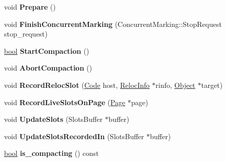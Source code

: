 \begin{DoxyCompactItemize}
void {\bfseries Prepare} ()
\item 
\mbox{\label{classv8_1_1internal_1_1MarkCompactCollector_ab298a4186180480a32cdc871b0471aec}} 
void {\bfseries Finish\+Concurrent\+Marking} (Concurrent\+Marking\+::\+Stop\+Request stop\+\_\+request)
\item 
\mbox{\label{classv8_1_1internal_1_1MarkCompactCollector_a43093f29487f7a532733fe34457e1d85}} 
\mbox{\hyperlink{classbool}{bool}} {\bfseries Start\+Compaction} ()
\item 
\mbox{\label{classv8_1_1internal_1_1MarkCompactCollector_a4fdf8ab05e0f2a84df042b4197fcda89}} 
void {\bfseries Abort\+Compaction} ()
\item 
\mbox{\label{classv8_1_1internal_1_1MarkCompactCollector_a358a625342196fb58080e1709a136265}} 
void {\bfseries Record\+Reloc\+Slot} (\mbox{\hyperlink{classv8_1_1internal_1_1Code}{Code}} host, \mbox{\hyperlink{classv8_1_1internal_1_1RelocInfo}{Reloc\+Info}} $\ast$rinfo, \mbox{\hyperlink{classv8_1_1internal_1_1Object}{Object}} $\ast$target)
\item 
\mbox{\label{classv8_1_1internal_1_1MarkCompactCollector_a54ccab1f7e9bad6738abdaef64d13eec}} 
void {\bfseries Record\+Live\+Slots\+On\+Page} (\mbox{\hyperlink{classv8_1_1internal_1_1Page}{Page}} $\ast$page)
\item 
\mbox{\label{classv8_1_1internal_1_1MarkCompactCollector_a702de8dcf3805cb26737fd8c49ee418f}} 
void {\bfseries Update\+Slots} (Slots\+Buffer $\ast$buffer)
\item 
\mbox{\label{classv8_1_1internal_1_1MarkCompactCollector_aa457d18f672391249f62c8f3da4a2bd2}} 
void {\bfseries Update\+Slots\+Recorded\+In} (Slots\+Buffer $\ast$buffer)
\item 
\mbox{\label{classv8_1_1internal_1_1MarkCompactCollector_a0aefdd8b8b50a471f4ab14827b26c4ad}} 
\mbox{\hyperlink{classbool}{bool}} {\bfseries is\+\_\+compacting} () const

\end{DoxyCompactItemize}
